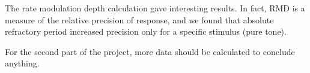 The rate modulation depth calculation gave interesting results. 
In fact, RMD is a measure of the relative precision of response,
and we found that absolute refractory period increased precision only 
for a specific stimulus (pure tone). %

For the second part of the project, more data should be calculated to conclude anything.